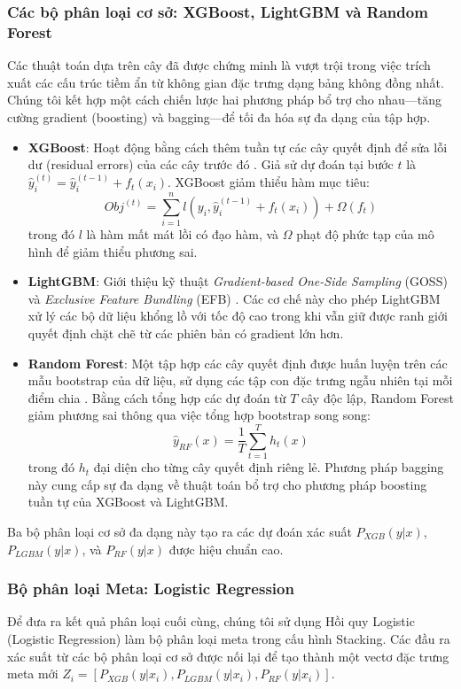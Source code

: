 \subsubsection{Các bộ phân loại cơ sở: XGBoost, LightGBM và Random Forest}
Các thuật toán dựa trên cây đã được chứng minh là vượt trội trong việc trích xuất các cấu trúc tiềm ẩn từ không gian đặc trưng dạng bảng không đồng nhất. Chúng tôi kết hợp một cách chiến lược hai phương pháp bổ trợ cho nhau—tăng cường gradient (boosting) và bagging—để tối đa hóa sự đa dạng của tập hợp.
\begin{itemize}
    \item \textbf{XGBoost}: Hoạt động bằng cách thêm tuần tự các cây quyết định để sửa lỗi dư (residual errors) của các cây trước đó \cite{friedman2001greedy, chen2016xgboost}. Giả sử dự đoán tại bước $t$ là $\hat{y}_i^{(t)} = \hat{y}_i^{(t-1)} + f_t(x_i)$. XGBoost giảm thiểu hàm mục tiêu:
    \begin{equation}
        Obj^{(t)} = \sum_{i=1}^{n} l\left(y_i, \hat{y}_i^{(t-1)} + f_t(x_i)\right) + \Omega(f_t)
    \end{equation}
    trong đó $l$ là hàm mất mát lồi có đạo hàm, và $\Omega$ phạt độ phức tạp của mô hình để giảm thiểu phương sai.
    \item \textbf{LightGBM}: Giới thiệu kỹ thuật \textit{Gradient-based One-Side Sampling} (GOSS) và \textit{Exclusive Feature Bundling} (EFB) \cite{ke2017lightgbm}. Các cơ chế này cho phép LightGBM xử lý các bộ dữ liệu khổng lồ với tốc độ cao trong khi vẫn giữ được ranh giới quyết định chặt chẽ từ các phiên bản có gradient lớn hơn.
    \item \textbf{Random Forest}: Một tập hợp các cây quyết định được huấn luyện trên các mẫu bootstrap của dữ liệu, sử dụng các tập con đặc trưng ngẫu nhiên tại mỗi điểm chia \cite{breiman2001random}. Bằng cách tổng hợp các dự đoán từ $T$ cây độc lập, Random Forest giảm phương sai thông qua việc tổng hợp bootstrap song song:
    \begin{equation}
        \hat{y}_{RF}(x) = \frac{1}{T} \sum_{t=1}^{T} h_t(x)
    \end{equation}
    trong đó $h_t$ đại diện cho từng cây quyết định riêng lẻ. Phương pháp bagging này cung cấp sự đa dạng về thuật toán bổ trợ cho phương pháp boosting tuần tự của XGBoost và LightGBM.
\end{itemize}
Ba bộ phân loại cơ sở đa dạng này tạo ra các dự đoán xác suất $P_{XGB}(y|x)$, $P_{LGBM}(y|x)$, và $P_{RF}(y|x)$ được hiệu chuẩn cao.

\subsubsection{Bộ phân loại Meta: Logistic Regression}
Để đưa ra kết quả phân loại cuối cùng, chúng tôi sử dụng Hồi quy Logistic (Logistic Regression) làm bộ phân loại meta trong cấu hình Stacking. Các đầu ra xác suất từ các bộ phân loại cơ sở được nối lại để tạo thành một vectơ đặc trưng meta mới $Z_i = [P_{XGB}(y|x_i), P_{LGBM}(y|x_i), P_{RF}(y|x_i)]$.

